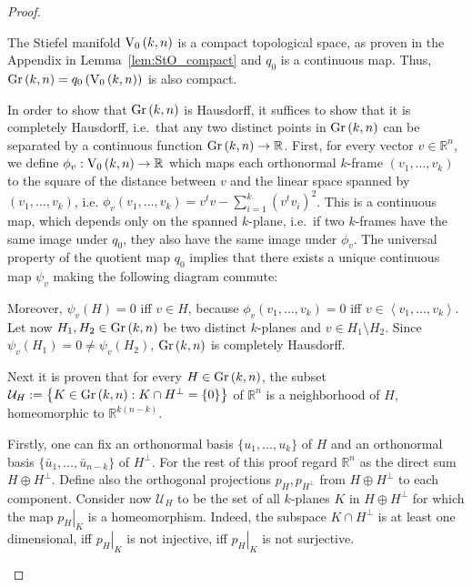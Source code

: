 \begin{proof} \begin{b_item}
\item The Stiefel manifold $\StO{k}{n}$ is a compact topological space, as proven in the Appendix in Lemma~\ref{lem:StO_compact} and $q_0$ is a continuous map. Thus, $\Gr{k}{n}=q_0\left(\StO{k}{n}\right)$ is also compact.
\item In order to show that $\Gr{k}{n}$ is Hausdorff, it suffices to show that it is completely Hausdorff, i.e.\ that any two distinct points in $\Gr{k}{n}$ can be separated by a continuous function $\Gr{k}{n}\to\mathbb{R}$. First, for every vector $v\in\mathbb{R}^n$, we define $\phi_v:\StO{k}{n}\to\mathbb{R}$ which maps each orthonormal $k$-frame $(v_1,\ldots,v_k)$ to the square of the distance between $v$ and the linear space spanned by $(v_1,\ldots,v_k)$, i.e.
$\phi_v(v_1,\ldots,v_k)=v^tv-\sum_{i=1}^k{\left(v^tv_i\right)}^2$.
This is a continuous map, which depends only on the spanned $k$-plane, i.e.\ if two $k$-frames have the same image under $q_0$, they also have the same image under $\phi_v$. The universal property of the quotient map $q_0$ implies that there exists a unique continuous map $\psi_v$ making the following diagram commute:

\begin{center}
\end{center}

Moreover, $\psi_v(H)=0$ iff $v\in H$, because $\phi_v(v_1,\ldots,v_k)=0$ iff $v\in \left<v_1,\ldots,v_k\right>$.
Let now $H_1,H_2\in\Gr{k}{n}$ be two distinct $k$-planes and $v\in H_1\setminus H_2$.
Since $\psi_v(H_1)=0\neq\psi_v(H_2)$, $\Gr{k}{n}$ is completely Hausdorff.

\item Next it is proven that for every $H\in\Gr{k}{n}$, the subset $\mathcal{U}_H:=\left\{K\in\Gr{k}{n}:K\cap H^{\perp}=\{0\}\right\}$ of $\mathbb{R}^n$ is a neighborhood of $H$, homeomorphic to $\mathbb{R}^{k(n-k)}$.

Firstly, one can fix an orthonormal basis $\{u_1,\ldots,u_k\}$ of $H$ and an orthonormal basis $\{\bar{u}_1,\ldots,\bar{u}_{n-k}\}$ of $H^{\perp}$. For the rest of this proof regard $\mathbb{R}^n$ as the direct sum $H\oplus H^{\perp}$. Define also the orthogonal projections $p_H,p_{H^{\perp}}$ from $H\oplus H^{\perp}$ to each component.
Consider now $\mathcal{U}_H$ to be the set of all $k$-planes $K$ in $H\oplus H^{\perp}$ for which the map $\left.p_H\right|_{K}$ is a homeomorphism. Indeed, the subspace $K\cap H^{\perp}$ is at least one dimensional, iff $\left.p_H\right|_K$ is not injective, iff $\left.p_H\right|_K$ is not surjective.


\end{b_item}
\end{proof}
